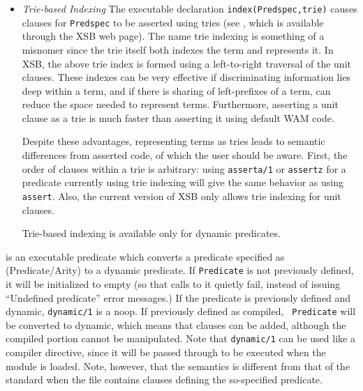 \begin{description}
\begin{itemize}
\item {\em Trie-based Indexing}
The executable declaration {\tt index(Predspec,trie)} causes clauses
for {\tt Predspec} to be asserted using tries (see \cite{RRSSW98},
which is available through the XSB web page).  The name trie indexing
is something of a misnomer since the trie itself both indexes the term
and represents it.  In XSB, the above trie index is formed using a
left-to-right traversal of the unit clauses.  These indexes can be
very effective if discriminating information lies deep within a term,
and if there is sharing of left-prefixes of a term, can reduce the
space needed to represent terms.  Furthermore, asserting a unit clause
as a trie is much faster than asserting it using default WAM code.

Despite these advantages, representing terms as tries leads to
semantic differences from asserted code, of which the user should be
aware.  First, the order of clauses within a trie is arbitrary: using
{\tt asserta/1} or {\tt assertz} for a predicate currently using trie
indexing will give the same behavior as using {\tt assert}.  Also, the
current version of XSB only allows trie indexing for unit clauses.

Trie-based indexing is available only for dynamic predicates.
\end{itemize}

\label{dynamic/1}
is an executable predicate which converts a predicate specified as
(Predicate/Arity) to a dynamic predicate. If {\tt Predicate} is not
previously defined, it will be initialized to empty (so that calls to
it quietly fail, instead of issuing {\sf ``Undefined predicate''}
error messages.) If the predicate is previously defined and dynamic,
{\tt dynamic/1} is a noop. If previously defined as compiled, {\tt
Predicate} will be converted to dynamic, which means that clauses can
be added, although the compiled portion cannot be manipulated.  Note
that {\tt dynamic/1} can be used like a compiler directive, since it
will be passed through to be executed when the module is loaded. Note,
however, that the semantics is different from that of the standard
\cite{ISO-Prolog} when the file contains clauses defining the
so-specified predicate.


\end{description}
